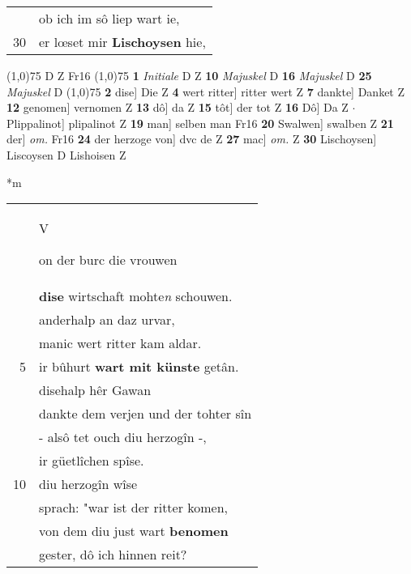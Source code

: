 \documentclass[8pt,a4paper,notitlepage]{article}
\begin{document}
\begin{table}[ht]
\begin{minipage}[t]{0.5\linewidth}
\begin{tabular}{rl}
 & ob ich im sô liep wart ie,\\ 
30 & er lœset mir \textbf{Lischoysen} hie,\\ 
\end{tabular}
\scriptsize
\line(1,0){75} \newline
D Z Fr16 \newline
\line(1,0){75} \newline
\textbf{1} \textit{Initiale} D Z  \textbf{10} \textit{Majuskel} D  \textbf{16} \textit{Majuskel} D  \textbf{25} \textit{Majuskel} D  \newline
\line(1,0){75} \newline
\textbf{2} dise] Die Z \textbf{4} wert ritter] ritter wert Z \textbf{7} dankte] Danket Z \textbf{12} genomen] vernomen Z \textbf{13} dô] da Z \textbf{15} tôt] der tot Z \textbf{16} Dô] Da Z  $\cdot$ Plippalinot] plipalinot Z \textbf{19} man] selben man Fr16 \textbf{20} Swalwen] swalben Z \textbf{21} der] \textit{om.} Fr16 \textbf{24} der herzoge von] dvc de Z \textbf{27} mac] \textit{om.} Z \textbf{30} Lischoysen] Liscoysen D Lishoisen Z \newline
\end{minipage}
\hspace{0.5cm}
\begin{minipage}[t]{0.5\linewidth}
\small
\begin{center}*m
\end{center}
\begin{tabular}{rl}
 & \begin{large}V\end{large}on der burc die vrouwen\\ 
 & \textbf{dise} wirtschaft mohte\textit{n} schouwen.\\ 
 & anderhalp an daz urvar,\\ 
 & manic wert ritter kam aldar.\\ 
5 & ir bûhurt \textbf{wart mit künste} getân.\\ 
 & disehalp hêr Gawan\\ 
 & dankte dem verjen und der tohter sîn\\ 
 & - alsô tet ouch diu herzogîn -,\\ 
 & ir güetlîchen spîse.\\ 
10 & diu herzogîn wîse\\ 
 & sprach: "war ist der ritter komen,\\ 
 & von dem diu just wart \textbf{benomen}\\ 
 & gester, dô ich hinnen reit?\\ 

\end{tabular}
\end{minipage}
\end{table}
\end{document}
